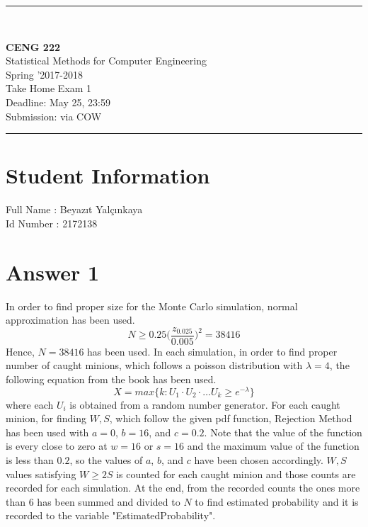 \documentclass[12pt]{article}
\newcommand{\HRule}{\rule{\linewidth}{1mm}}
\begin{document}
\noindent
\HRule \\[3mm]
\begin{flushright}

                                         \LARGE \textbf{CENG 222}  \\[4mm]
                                         \Large Statistical Methods for Computer Engineering \\[4mm]
                                        \normalsize      Spring '2017-2018 \\
                                           \Large   Take Home Exam 1 \\
                    \normalsize Deadline: May 25, 23:59 \\
                    \normalsize Submission: via COW
\end{flushright}
\HRule

\section*{Student Information }
Full Name : Beyazıt Yalçınkaya \\
Id Number : 2172138 \\

\section*{Answer 1}

In order to find proper size for the Monte Carlo simulation, normal approximation has been used.
\begin{equation}
	N \geq 0.25\Big(\frac{z_{0.025}}{0.005}\Big)^2 = 38416
\end{equation}
Hence, $N = 38416$ has been used. In each simulation, in order to find proper number of caught minions, which follows a poisson distribution with $\lambda = 4$, the following equation from the book has been used.
\begin{equation}
	X = max\{k:U_1 \cdot U_2 \cdot \ldots U_k \geq e^{-\lambda}\} 
\end{equation}
where each $U_i$ is obtained from a random number generator. For each caught minion, for finding $W, S$, which follow the given pdf function, Rejection Method has been used with $a = 0$, $b = 16$, and $c = 0.2$. Note that the value of the function is every close to zero at $w = 16$ or $s = 16$ and the maximum value of the function is less than $0.2$, so the values of $a$, $b$, and $c$ have been chosen accordingly. $W, S$ values satisfying $W \geq 2S$ is counted for each caught minion and those counts are recorded for each simulation. At the end, from the recorded counts the ones more than $6$ has been summed and divided to $N$ to find estimated probability and it is recorded to the variable "EstimatedProbability".
\end{document}
